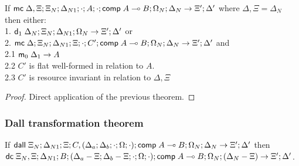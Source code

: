 If $\mathsf{mc} \; \Delta, \Xi; \Xi_N; \Delta_{N1}; \cdot; A; \cdot; \mathsf{comp} \; A \multimap B; \Omega_N; \Delta_N \rightarrow \Xi'; \Delta'$ where $\Delta, \Xi = \Delta_N$ then either:\\
1. \hspace{1cm} $\mathsf{d}_1 \; \Delta_N; \Xi_N; \Delta_{N1}; \Omega_N \rightarrow \Xi'; \Delta'$ or \\
2. \hspace{1cm} $\mathsf{mc} \; \Delta; \Xi_N; \Delta_{N1}; \Xi; \cdot; C'; \mathsf{comp} \; A \multimap B; \Omega_N; \Delta_N \rightarrow \Xi'; \Delta'$ and \\
2.1 \hspace{2cm} $\mathsf{m}_0 \; \Delta_1 \rightarrow A$ \\
2.2 \hspace{2cm} $C'$ is flat well-formed in relation to $A$. \\
2.3 \hspace{2cm} $C'$ is resource invariant in relation to $\Delta, \Xi$ \\

\begin{proof}
Direct application of the previous theorem.
\end{proof}

\subsubsection{Dall transformation theorem}

If $\mathsf{dall} \; \Xi_N; \Delta_{N1}; \Xi; C, (\Delta_a; \Delta_b; \cdot; \Omega; \cdot); \mathsf{comp} \; A \multimap B; \Omega_N; \Delta_N \rightarrow \Xi'; \Delta'$ then\\
$\mathsf{dc} \; \Xi_N, \Xi; \Delta_{N1}; B; (\Delta_a - \Xi; \Delta_b - \Xi; \cdot; \Omega; \cdot); \mathsf{comp} \; A \multimap B; \Omega_N; (\Delta_N - \Xi) \rightarrow \Xi'; \Delta'$.

